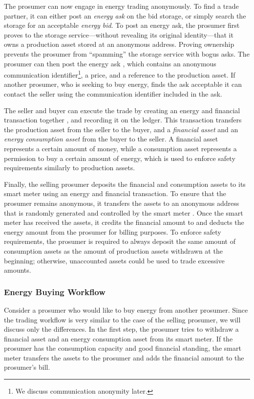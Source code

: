 The prosumer can now engage in energy trading anonymously.  To find a
trade partner, it can either post an \emph{energy ask} on the bid
storage, or simply search the storage for an acceptable \emph{energy
  bid}.  To post an energy ask, the prosumer first proves to the
storage service---without revealing its original identity---that it
owns a production asset stored at an anonymous address.  Proving
ownership prevents the prosumer from ``spamming'' the storage service
with bogus asks.  The prosumer can then post the energy ask
, which contains an anonymous communication
identifier\footnote{We discuss communication anonymity later.}, a
price, and a reference to the production asset.  If another prosumer,
who is seeking to buy energy, finds the ask acceptable it can contact
the seller using the communication identifier included in the ask.

The seller and buyer can execute the trade by creating an energy and
financial transaction together , and recording it on the
ledger.  This transaction transfers the production asset from the
seller to the buyer, and a \emph{financial asset} and an \emph{energy
  consumption asset} from the buyer to the seller.  A financial asset
represents a certain amount of money, while a consumption asset
represents a permission to buy a certain amount of energy, which is
used to enforce safety requirements similarly to production assets.

Finally, the selling prosumer deposits the financial and consumption
assets to its smart meter using an energy and financial transaction.
To ensure that the prosumer remains anonymous, it transfers the assets
to an anonymous address that is randomly generated and controlled by
the smart meter .  Once the smart meter has received the
assets, it credits the financial amount to and deducts the energy
amount from the prosumer for billing purposes.  To enforce safety
requirements, the prosumer is required to always deposit the same
amount of consumption assets as the amount of production assets
withdrawn at the beginning; otherwise, unaccounted assets could be
used to trade excessive amounts.

\subsubsection{Energy Buying Workflow}
Consider a prosumer who would like to buy energy from another
prosumer.  Since the trading workflow is very similar to the case of
the selling prosumer, we will discuss only the differences.  In the
first step, the prosumer tries to withdraw a financial asset and an
energy consumption asset from its smart meter.  If the prosumer has
the consumption capacity and good financial standing, the smart meter
transfers the assets to the prosumer and adds the financial amount to
the prosumer's bill.

